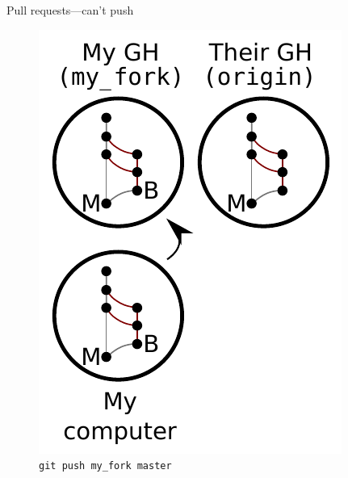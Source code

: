 \begin{frame}{Pull requests---can't push}
  \begin{figure}
    \includegraphics{fork_016.pdf}
    \\ \texttt{git push my\_fork master}
    \\ \texttt{}
  \end{figure}
\end{frame}


